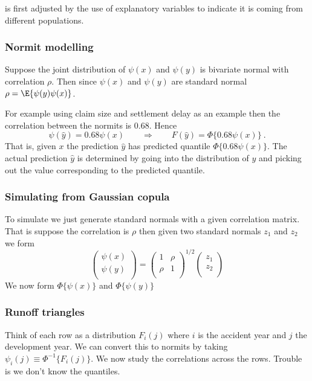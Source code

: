 is first adjusted by the use of explanatory variables to indicate it is coming from different populations.

\subsubsection{Normit modelling}

Suppose the joint distribution of $\psi(x)$ and $\psi(y)$ is bivariate normal with correlation $\rho$.   Then since $\psi(x)$ and $\psi(y)$ are standard normal  
$\rho=\E\{\psi(y)\psi(x)\}$.

For example using claim size and settlement delay as an example then the correlation between the normits is 0.68.   Hence
$$
\psi(\hat y)=0.68\psi(x)\qquad\Rightarrow\qquad  F(\hat y) =\Phi\{0.68\psi(x)\}\ .
$$
That is, given $x$  the prediction $\hat y$ has predicted quantile $\Phi\{0.68\psi(x)\}$.  The actual prediction $\hat y$ is determined by going into the distribution of $y$ and picking out the value corresponding to the predicted quantile.

\subsubsection{Simulating from Gaussian copula}

To simulate we just generate standard normals with a given correlation matrix.   That is suppose the correlation is $\rho$ then given two standard normals $z_1$ and $z_2$ we form
$$\left(%
\begin{array}{c}
  \psi(x) \\
  \psi(y) \\
\end{array}%
\right)=
\left(%
\begin{array}{cc}
  1 & \rho \\
  \rho & 1 \\
\end{array}%
\right)^{1/2} \left(%
\begin{array}{c}
  z_1 \\
  z_2 \\
\end{array}%
\right)
$$ 
We now form $\Phi\{\psi(x)\}$ and $\Phi\{\psi(y)\}$

\subsubsection{Runoff triangles}

Think of each row as a distribution $F_i(j)$ where $i$ is the accident year and $j$ the development year.  We can convert this to normits by taking $\psi_i(j)\equiv\Phi^{-1}\{F_i(j)\}$.  We now study the correlations across the rows.  Trouble is we don't know the quantiles.

